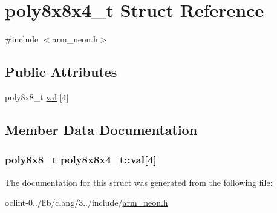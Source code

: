 \hypertarget{structpoly8x8x4__t}{\section{poly8x8x4\-\_\-t Struct Reference}
\label{structpoly8x8x4__t}
}


{\ttfamily \#include $<$arm\-\_\-neon.\-h$>$}

\subsection*{Public Attributes}
\begin{DoxyCompactItemize}
\item 
poly8x8\-\_\-t \hyperlink{structpoly8x8x4__t_aa046d168ccd16096777ab61d2f936ccb}{val} \mbox{[}4\mbox{]}
\end{DoxyCompactItemize}


\subsection{Member Data Documentation}
\hypertarget{structpoly8x8x4__t_aa046d168ccd16096777ab61d2f936ccb}{
\subsubsection[{val}]{\setlength{\rightskip}{0pt plus 5cm}poly8x8\-\_\-t poly8x8x4\-\_\-t\-::val\mbox{[}4\mbox{]}}}\label{structpoly8x8x4__t_aa046d168ccd16096777ab61d2f936ccb}


The documentation for this struct was generated from the following file\-:\begin{DoxyCompactItemize}
\item 
oclint-\/0../lib/clang/3../include/\hyperlink{arm__neon_8h}{arm\-\_\-neon.\-h}\end{DoxyCompactItemize}
